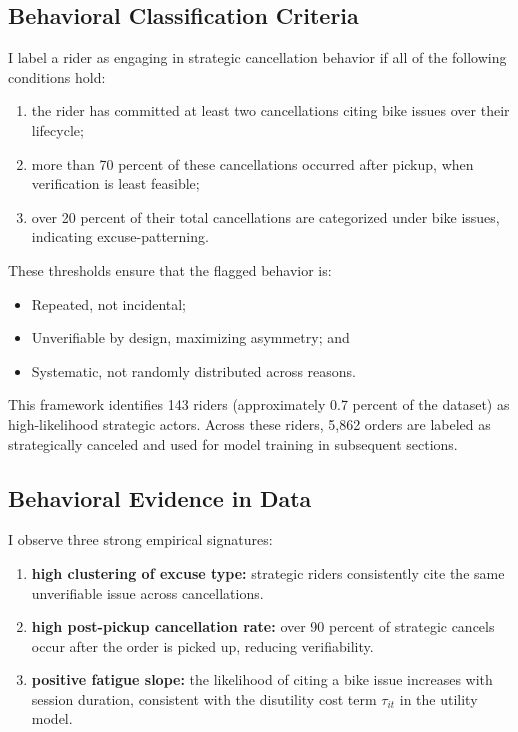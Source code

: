 \documentclass[12pt,letterpaper]{article}
\begin{document}
\subsection{Behavioral Classification Criteria}

I label a rider as engaging in strategic cancellation behavior if all of the following conditions hold:

\begin{enumerate}
    \item the rider has committed at least two cancellations citing bike issues over their lifecycle;
    \item more than 70 percent of these cancellations occurred after pickup, when verification is least feasible;
    \item over 20 percent of their total cancellations are categorized under bike issues, indicating excuse-patterning.
\end{enumerate}

These thresholds ensure that the flagged behavior is:

\begin{itemize}
    \item Repeated, not incidental;
    \item Unverifiable by design, maximizing asymmetry; and
    \item Systematic, not randomly distributed across reasons.
\end{itemize}

This framework identifies 143 riders (approximately 0.7 percent of the dataset) as high-likelihood strategic actors. Across these riders, 5,862 orders are labeled as strategically canceled and used for model training in subsequent sections.

\subsection{Behavioral Evidence in Data}

I observe three strong empirical signatures:

\begin{enumerate}
    \item \textbf{high clustering of excuse type:} strategic riders consistently cite the same unverifiable issue across cancellations.
    \item \textbf{high post-pickup cancellation rate:} over 90 percent of strategic cancels occur after the order is picked up, reducing verifiability.
    \item \textbf{positive fatigue slope:} the likelihood of citing a bike issue increases with session duration, consistent with the disutility cost term $\tau_{it}$ in the utility model.
\end{enumerate}
\end{document}
